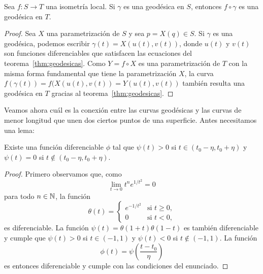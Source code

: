 \begin{corollary}
	Sea $f\colon S\to T$ una isometría local. Si $\gamma$ es una geodésica en $S$, entonces
	$f\circ\gamma$ es una geodésica en $T$.
\end{corollary}

\begin{proof}
	Sea $X$ una parametrización de $S$ y sea $p=X(q)\in S$. Si $\gamma$ es una
	geodésica, podemos escribir $\gamma(t)=X(u(t),v(t))$, donde $u(t)$ y $v(t)$
	son funciones diferenciables que satisfacen las ecuaciones del
	teorema~\ref{thm:geodesicas}. Como $Y=f\circ X$ es una parametrización de
	$T$ con la misma forma fundamental que tiene la parametrización $X$, la
	curva $f(\gamma(t))=f(X(u(t),v(t))=Y(u(t),v(t))$ también resulta una
	geodésica en $T$ gracias al teorema~\ref{thm:geodesicas}.
\end{proof}


Veamos ahora cuál es la conexión entre las curvas geodésicas y las curvas de
menor longitud que unen dos ciertos puntos de una superficie.  
Antes necesitamos una lema:

\begin{lemma}
	\label{lem:suavizante}
	Existe una función diferenciable $\phi$ tal que $\psi(t)>0$ si $t\in(t_0-\eta,t_0+\eta)$
	y $\psi(t)=0$ si $t\not\in(t_0-\eta,t_0+\eta)$. 
\end{lemma}

\begin{proof}
	Primero observamos que, como 
	\[
		\lim_{t\to 0}t^ne^{1/t^2}=0
	\]
	para todo $n\in\mathbb{N}$, la función
	\[
		\theta(t)=\begin{cases}
			e^{-1/t^2} & \text{si $t\geq0$},\\
			0 & \text{si $t<0$},
		\end{cases}
	\]
	es diferenciable. La función 
	$\psi(t)=\theta(1+t)\theta(1-t)$ 
	es también diferenciable y cumple que $\psi(t)>0$ si $t\in (-1,1)$ y $\psi(t)<0$ si $t\not\in(-1,1)$. La función
	\[
		\phi(t)=\psi\left(\frac{t-t_0}{\eta}\right)
	\]
	es entonces diferenciable y cumple con las condiciones del enunciado.
\end{proof}


